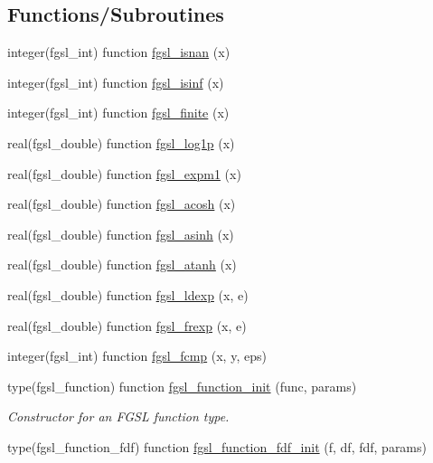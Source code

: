\subsection*{Functions/\+Subroutines}
\begin{DoxyCompactItemize}
\item 
integer(fgsl\+\_\+int) function \hyperlink{math_8finc_a5067c8634bbc3cd88a507d8816134d40}{fgsl\+\_\+isnan} (x)
\item 
integer(fgsl\+\_\+int) function \hyperlink{math_8finc_aa3b31b6c56e2b1a862bcaced664803fc}{fgsl\+\_\+isinf} (x)
\item 
integer(fgsl\+\_\+int) function \hyperlink{math_8finc_a740aba8e50497aee7f31503b9fa4ba6b}{fgsl\+\_\+finite} (x)
\item 
real(fgsl\+\_\+double) function \hyperlink{math_8finc_ae1ca85647dff8d9f70b3126845c87443}{fgsl\+\_\+log1p} (x)
\item 
real(fgsl\+\_\+double) function \hyperlink{math_8finc_ab63b6ca1585dc1aa1ad824c6621eed51}{fgsl\+\_\+expm1} (x)
\item 
real(fgsl\+\_\+double) function \hyperlink{math_8finc_af7330c8b04fc10b1850f2d4ce9291690}{fgsl\+\_\+acosh} (x)
\item 
real(fgsl\+\_\+double) function \hyperlink{math_8finc_a2d2d1b0a15932d8bbf2741cd2e7a4ba2}{fgsl\+\_\+asinh} (x)
\item 
real(fgsl\+\_\+double) function \hyperlink{math_8finc_a82dce86ff9a928aba7b35f9af6a9f5cc}{fgsl\+\_\+atanh} (x)
\item 
real(fgsl\+\_\+double) function \hyperlink{math_8finc_a4673afab0b7df7e7e3f05a057b5f8486}{fgsl\+\_\+ldexp} (x, e)
\item 
real(fgsl\+\_\+double) function \hyperlink{math_8finc_a178abc026a08abbe00d18c0fe8976135}{fgsl\+\_\+frexp} (x, e)
\item 
integer(fgsl\+\_\+int) function \hyperlink{math_8finc_ab40b3e555596120ef1e85184704415ca}{fgsl\+\_\+fcmp} (x, y, eps)
\item 
type(fgsl\+\_\+function) function \hyperlink{math_8finc_a3763fefa672f280ed40fb19756dbd88c}{fgsl\+\_\+function\+\_\+init} (func, params)
\begin{DoxyCompactList}\small\item\em Constructor for an F\+G\+S\+L function type. \end{DoxyCompactList}\item 
type(fgsl\+\_\+function\+\_\+fdf) function \hyperlink{math_8finc_abb3c595b71761c1825021ce600493f75}{fgsl\+\_\+function\+\_\+fdf\+\_\+init} (f, df, fdf, params)

\end{DoxyCompactItemize}
